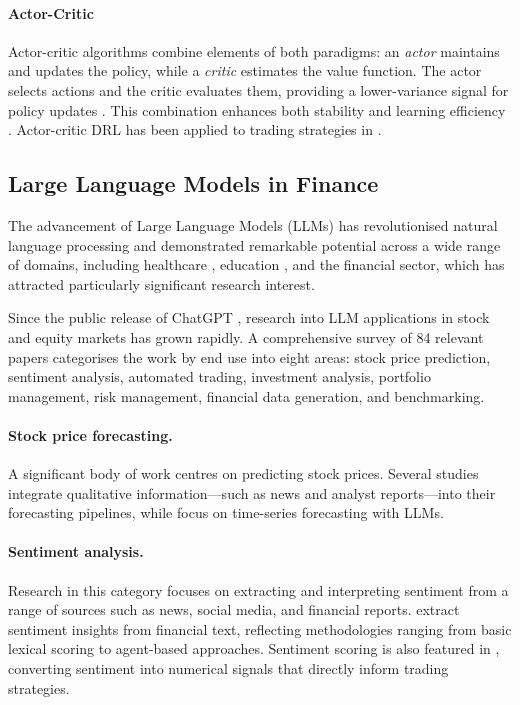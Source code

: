 \documentclass[conference]{IEEEtran}
\begin{document}
\paragraph{Actor-Critic}
\label{sec:actor-critic}

Actor-critic algorithms combine elements of both paradigms: an \emph{actor} maintains and
updates the policy, while a \emph{critic} estimates the value function. The actor selects
actions and the critic evaluates them, providing a lower-variance signal for policy updates
\cite{xiong2018}. This combination enhances both stability and learning efficiency
\cite{yang2020}. Actor-critic DRL has been applied to trading strategies in
\cite{ge2022,lima2021,liu2020actorcritic}.

\subsection{Large Language Models in Finance}
\label{sec:llms}

The advancement of Large Language Models (LLMs) has revolutionised natural language
processing and demonstrated remarkable potential across a wide range of domains, including
healthcare \cite{mehandru2024evaluating}, education \cite{zhang2024simulating}, and the financial
sector, which has attracted particularly significant research interest.

Since the public release of ChatGPT \cite{achiam2023gpt4}, research into LLM applications in stock and equity
markets has grown rapidly. A comprehensive survey \cite{jadhav2025llmequity} of 84
relevant papers categorises the work by end use into eight areas: stock price prediction,
sentiment analysis, automated trading, investment analysis, portfolio management, risk
management, financial data generation, and benchmarking.

\paragraph{Stock price forecasting.}
A significant body of work centres on predicting stock prices. Several studies
\cite{ni2024,ding2023,guo2024hauptmann,lopezlira2023}
integrate qualitative information---such as news and analyst reports---into their forecasting
pipelines, while \cite{valeyre2024,wang2024ts,wang2024b} focus on
time-series forecasting with LLMs.

\paragraph{Sentiment analysis.}
Research in this category focuses on extracting and interpreting sentiment from a range of
sources such as news, social media, and financial reports.
\cite{deng2022reddit,xing2024,kirtac2024}
extract sentiment insights from financial text, reflecting methodologies ranging from basic
lexical scoring to agent-based approaches.
Sentiment scoring is also featured in \cite{bond2023,lefort2024}, converting sentiment into
numerical signals that directly inform trading strategies.
\end{document}
